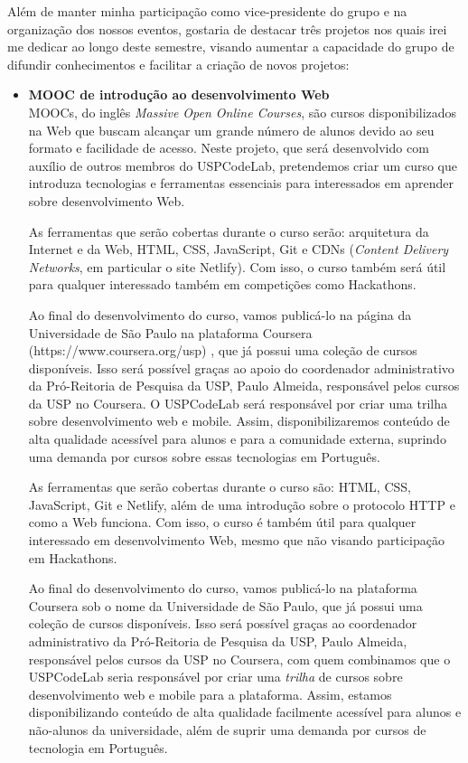 \documentclass[10pt,twoside,a4paper]{article}
\begin{document}
    Além de manter minha participação como vice-presidente do grupo e na organização dos nossos eventos, gostaria de destacar três projetos nos quais irei me dedicar ao longo deste semestre, visando aumentar a capacidade do grupo de difundir conhecimentos e facilitar a criação de novos projetos:

    \begin{itemize}
      \item \textbf{MOOC de introdução ao desenvolvimento Web}\\
        MOOCs, do inglês \textit{Massive Open Online Courses}, são cursos disponibilizados na Web que buscam alcançar um grande número de alunos devido ao seu formato e facilidade de acesso. Neste projeto, que será desenvolvido com auxílio de outros membros do USPCodeLab, pretendemos criar um curso que introduza tecnologias e ferramentas essenciais para interessados em aprender sobre desenvolvimento Web.
        
        As ferramentas que serão cobertas durante o curso serão: arquitetura da Internet e da Web, HTML, CSS, JavaScript, Git e CDNs (\textit{Content Delivery Networks}, em particular o site Netlify). Com isso, o curso também será útil para qualquer interessado também em competições como Hackathons.
        
        Ao final do desenvolvimento do curso, vamos publicá-lo na página da Universidade de São Paulo na plataforma Coursera (https://www.coursera.org/usp) , que já possui uma coleção de cursos disponíveis. Isso será possível graças ao apoio do coordenador administrativo da Pró-Reitoria de Pesquisa da USP, Paulo Almeida, responsável pelos cursos da USP no Coursera. O USPCodeLab será responsável por criar uma trilha sobre desenvolvimento web e mobile. Assim, disponibilizaremos conteúdo de alta qualidade acessível para alunos e para a comunidade externa, suprindo uma demanda por cursos sobre essas tecnologias em Português.

        
        As ferramentas que serão cobertas durante o curso são: HTML, CSS, JavaScript, Git e Netlify, além de uma introdução sobre o protocolo HTTP e como a Web funciona. Com isso, o curso é também útil para qualquer interessado em desenvolvimento Web, mesmo que não visando participação em Hackathons.
        
        Ao final do desenvolvimento do curso, vamos publicá-lo na plataforma Coursera sob o nome da Universidade de São Paulo, que já possui uma coleção de cursos disponíveis. Isso será possível graças ao coordenador administrativo da Pró-Reitoria de Pesquisa da USP, Paulo Almeida, responsável pelos cursos da USP no Coursera, com quem combinamos que o USPCodeLab seria responsável por criar uma \textit{trilha} de cursos sobre desenvolvimento web e mobile para a plataforma. Assim, estamos disponibilizando conteúdo de alta qualidade facilmente acessível para alunos e não-alunos da universidade, além de suprir uma demanda por cursos de tecnologia em Português.


\end{itemize}
\end{document}
